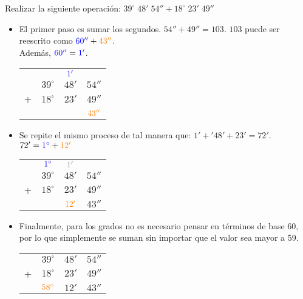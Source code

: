 \begin{example}
	Realizar la siguiente operación:
		$39^\circ\; 48'\; 54'' + 18^\circ\; 23'\; 49'' $
	\begin{itemize}
		\item El primer paso es sumar los segundos. $54'' + 49'' = 103$. $103$ puede 
		ser reescrito como $\textcolor{blue}{60''} + \textcolor{orange}{43''}$. \\
		Además, $\textcolor{blue}{60''} = \textcolor{blue}{1'}$.
		\begin{center}
			\begin{tabular}{ c c c c}
					& & $\textcolor{blue}{1'}$ & \\
					& $39^\circ$ & $48'$ & $54''$ \\
				+ & $18^\circ$  & $23'$ & $49''$ \\
				\hline
				&  &   & $\textcolor{orange}{43''}$
			\end{tabular}
		\end{center}		

		\item Se repite el mismo proceso de tal manera que: $1' +'48' + 23' = 72'$.
		$72' = \textcolor{blue}{1^\circ} + \textcolor{orange}{12'}$
		\begin{center}
			\begin{tabular}{ c c c c}
					& $\textcolor{blue}{1^\circ}$ & $\textcolor{gray}{1'}$ & \\
					& $39^\circ$ & $48'$ & $54''$ \\
				+ & $18^\circ$  & $23'$ & $49''$ \\
				\hline
				&  & $\textcolor{orange}{12'}$   &$43''$
			\end{tabular}
		\end{center}	

		\item Finalmente, para los grados no es necesario pensar en términos de base 
		60, por lo que simplemente se suman sin importar que el valor sea mayor a 
		59.
		\begin{center}
			\begin{tabular}{ c c c c}
					& $39^\circ$ & $48'$ & $54''$ \\
				+ & $18^\circ$  & $23'$ & $49''$ \\
				\hline
				& $\textcolor{orange}{58^\circ}$ & $12'$   &$43''$
			\end{tabular}
		\end{center}	
	\end{itemize}
\end{example}

